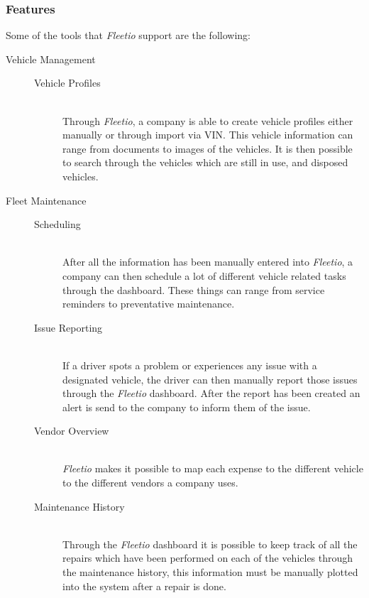 \subsubsection{Features}\label{ssub:features}
Some of the tools that \textit{Fleetio} support are the following:
\begin{description}
    \item[Vehicle Management] \hfill
    \begin{description}
        \item[Vehicle Profiles] \hfill \\
        Through \textit{Fleetio}, a company is able to create vehicle profiles either manually or through import via VIN. This vehicle information can range from documents to images of the vehicles.
        It is then possible to search through the vehicles which are still in use, and disposed vehicles.
    \end{description}

    \item[Fleet Maintenance] \hfill
    \begin{description}
        \item[Scheduling] \hfill \\
        After all the information has been manually entered into \textit{Fleetio}, a company can then schedule a lot of different vehicle related tasks through the dashboard.
        These things can range from service reminders to preventative maintenance.
        \item[Issue Reporting] \hfill \\
        If a driver spots a problem or experiences any issue with a designated vehicle, the driver can then manually report those issues through the \textit{Fleetio} dashboard.
        After the report has been created an alert is send to the company to inform them of the issue.
        \item[Vendor Overview] \hfill \\
        \textit{Fleetio} makes it possible to map each expense to the different vehicle to the different vendors a company uses.
        \item[Maintenance History] \hfill \\
        Through the \textit{Fleetio} dashboard it is possible to keep track of all the repairs which have been performed on each of the vehicles through the maintenance history, this information must be manually plotted into the system after a repair is done.
    \end{description}


\end{description}
